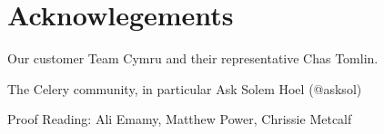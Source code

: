 \section*{Acknowlegements}

Our customer Team Cymru and their representative Chas Tomlin.

The Celery community, in particular Ask Solem Hoel (@asksol) 

Proof Reading: Ali Emamy, Matthew Power, Chrissie Metcalf